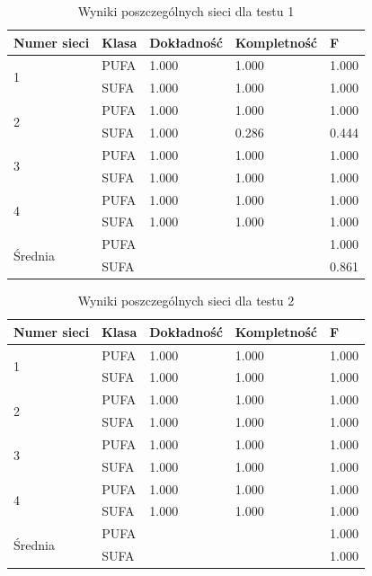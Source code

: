 \documentclass{classrep}
\begin{document}
\begin{table}
\caption{Wyniki poszczególnych sieci dla testu 1}
\label{testTab2}
\begin{tabular}{|p{1.5cm}|p{2.5cm}|p{2.5cm}|p{2.5cm}|p{2.5cm}|}
 \textbf{Numer sieci} & \textbf{Klasa} & \textbf{Dokładność} & \textbf{Kompletność} & \textbf{F} \\ \hline
\multirow{2}{*}{1} 
& PUFA & 1.000 & 1.000 & 1.000 \\
& SUFA & 1.000 & 1.000 & 1.000 \\ \hline
\multirow{2}{*}{2} 
& PUFA & 1.000 & 1.000 & 1.000 \\
& SUFA & 1.000 & 0.286 & 0.444 \\ \hline
\multirow{2}{*}{3} 
& PUFA & 1.000 & 1.000 & 1.000 \\
& SUFA & 1.000 & 1.000 & 1.000\\ \hline
\multirow{2}{*}{4} 
& PUFA & 1.000 & 1.000 & 1.000 \\
& SUFA & 1.000 & 1.000 & 1.000 \\ \hline
\multirow{2}{*}{Średnia}
& PUFA &       &       & 1.000 \\
& SUFA &       &       & 0.861 \\\hline
\end{tabular}
\end{table}

\begin{table}
\caption{Wyniki poszczególnych sieci dla testu 2}
\label{testTab3}
\begin{tabular}{|p{1.5cm}|p{2.5cm}|p{2.5cm}|p{2.5cm}|p{2.5cm}|}
 \textbf{Numer sieci} & \textbf{Klasa} & \textbf{Dokładność} & \textbf{Kompletność} & \textbf{F} \\ \hline
\multirow{2}{*}{1} 
& PUFA & 1.000 & 1.000 & 1.000 \\
& SUFA & 1.000 & 1.000 & 1.000 \\ \hline
\multirow{2}{*}{2} 
& PUFA & 1.000 & 1.000 & 1.000 \\
& SUFA & 1.000 & 1.000 & 1.000 \\ \hline
\multirow{2}{*}{3} 
& PUFA & 1.000 & 1.000 & 1.000 \\
& SUFA & 1.000 & 1.000 & 1.000\\ \hline
\multirow{2}{*}{4} 
& PUFA & 1.000 & 1.000 & 1.000 \\
& SUFA & 1.000 & 1.000 & 1.000 \\ \hline
\multirow{2}{*}{Średnia}
& PUFA &       &       & 1.000 \\
& SUFA &       &       & 1.000 \\\hline
\end{tabular}
\end{table}
\end{document}
